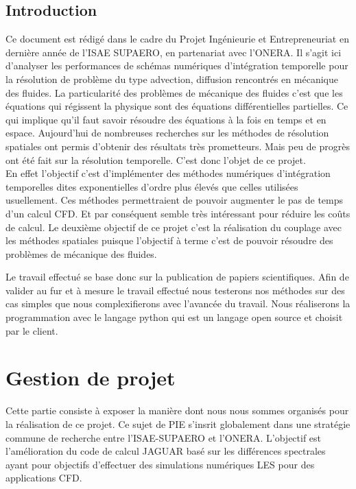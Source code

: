 \documentclass[a4paper,12pt]{report}
\theoremstyle{break}
\begin{document}
\chapter*{Introduction}
Ce document est rédigé dans le cadre du Projet Ingénieurie et Entrepreneuriat en dernière année de l'ISAE SUPAERO, en partenariat avec l'ONERA. Il s'agit ici d'analyser les performances de schémas numériques d’intégration
temporelle pour la résolution de problème du type advection, diffusion rencontrés en mécanique des fluides. La particularité des problèmes de mécanique des fluides c'est que les équations qui régissent la physique sont des équations différentielles partielles. Ce qui implique qu'il faut savoir résoudre des équations à la fois en temps et en espace. Aujourd'hui de nombreuses recherches sur les méthodes de résolution spatiales ont permis d'obtenir des résultats très prometteurs. Mais peu de progrès ont été fait sur la résolution temporelle. C'est donc l'objet de ce projet. \\

En effet l'objectif c'est d'implémenter des méthodes numériques d'intégration temporelles dites \og exponentielles \fg{} d'ordre plus élevés que celles utilisées usuellement.  Ces méthodes permettraient de pouvoir augmenter le pas de temps d'un calcul CFD. Et par conséquent semble très intéressant pour réduire les coûts de calcul. Le deuxième objectif de ce projet c'est la réalisation du couplage avec les méthodes spatiales puisque l'objectif à terme c'est de pouvoir résoudre des problèmes de mécanique des fluides. 

Le travail effectué se base donc sur la publication de papiers scientifiques. Afin de valider au fur et à mesure le travail effectué nous testerons nos méthodes sur des cas simples que nous complexifierons avec l'avancée du travail. Nous réaliserons la programmation avec le langage python qui est un langage open source et choisit par le client. 



\part{Gestion de projet}

\vfill

Cette partie consiste à exposer la manière dont nous nous sommes organisés pour la réalisation de ce projet. Ce sujet de PIE s'insrit globalement dans une stratégie commune de recherche entre l'ISAE-SUPAERO et l'ONERA. L'objectif est l'amélioration du code de calcul JAGUAR basé sur les différences spectrales ayant pour objectifs d'effectuer des simulations numériques LES pour des applications CFD.
\end{document}
